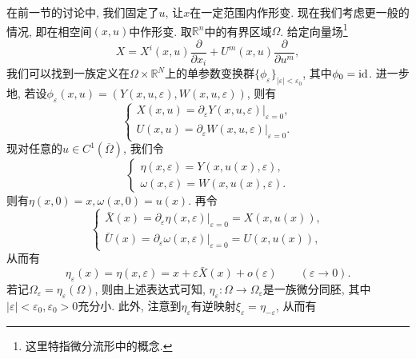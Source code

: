 在前一节的讨论中, 我们固定了$u$, 让$x$在一定范围内作形变. 现在我们考虑更一般的情况, 即在相空间$(x, u)$中作形变.
取$\mathbb{R}^n$中的有界区域$\Omega$. 给定向量场\footnote{这里特指微分流形中的概念.}
\begin{equation}\label{30}
    X = X^i(x, u)\frac{\partial}{\partial x_i} + U^m(x, u)\frac{\partial}{\partial u^m},
\end{equation}
我们可以找到一族定义在$\Omega \times \mathbb{R}^N$上的单参数变换群$\{\phi_{\varepsilon}\}_{|\varepsilon| < \varepsilon_0}$, 其中$\phi_0 = {\rm id}$.
进一步地, 若设$\phi_{\varepsilon}(x, u) = (Y(x, u, \varepsilon), W(x, u, \varepsilon))$, 则有 
\begin{equation*}
    \begin{cases} 
        X(x, u) = \partial_{\varepsilon}Y(x, u, \varepsilon)|_{\varepsilon = 0}, \\  
        U(x, u) = \partial_{\varepsilon}W(x, u, \varepsilon)|_{\varepsilon = 0}. 
    \end{cases}
\end{equation*}
现对任意的$u \in C^1(\overline{\Omega})$, 我们令
\begin{equation*}
    \begin{cases} 
        \eta(x, \varepsilon) = Y(x, u(x), \varepsilon), \\  
        \omega(x, \varepsilon) = W(x, u(x), \varepsilon). 
    \end{cases}
\end{equation*}
则有$\eta(x, 0) = x, \omega(x, 0) = u(x)$. 再令
\begin{equation}\label{31}
    \begin{cases} 
        \bar{X}(x) = \partial_{\varepsilon}\eta(x, \varepsilon)|_{\varepsilon = 0} = X(x, u(x)), \\  
        \bar{U}(x) = \partial_{\varepsilon}\omega(x, \varepsilon)|_{\varepsilon = 0} = U(x, u(x)), 
    \end{cases} 
\end{equation}
从而有 
\begin{equation*}
    \eta_{\varepsilon}(x) = \eta(x, \varepsilon) = x+ \varepsilon\bar{X}(x) + o(\varepsilon) \qquad (\varepsilon \rightarrow 0). 
\end{equation*}
若记$\Omega_{\varepsilon} = \eta_{\varepsilon}(\Omega)$, 则由上述表达式可知, $\eta_{\varepsilon}\colon \Omega \rightarrow \Omega_{\varepsilon}$是一族微分同胚, 其中$|\varepsilon| < \varepsilon_0, \varepsilon_0 > 0$充分小.
此外, 注意到$\eta_{\varepsilon}$有逆映射$\xi_{\varepsilon} = \eta_{-\varepsilon}$, 从而有
